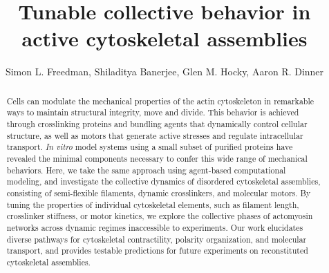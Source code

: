 \documentclass[12pt]{article}
\begin{document}
\title{Tunable collective behavior in active cytoskeletal assemblies}
\author{Simon L. Freedman, Shiladitya Banerjee, Glen M. Hocky, Aaron R. Dinner}
\date{}
\maketitle
\begin{abstract}
  Cells can modulate the mechanical properties of the actin cytoskeleton in 
  remarkable ways to maintain structural  integrity, move and divide. This 
  behavior is achieved through crosslinking proteins and bundling agents that 
  dynamically control cellular structure, as well as motors that generate
  active stresses and regulate intracellular transport. {\em In vitro} model 
  systems using a small subset of purified proteins have  revealed the minimal 
  components necessary to confer this wide range of mechanical behaviors. Here, 
  we take the same  approach using agent-based  computational modeling, and 
  investigate the collective dynamics of disordered   cytoskeletal assemblies, 
  consisting of  semi-flexible filaments, dynamic crosslinkers, and molecular 
  motors. By tuning  the properties of individual  cytoskeletal elements, such 
  as filament length, crosslinker stiffness, or motor kinetics, we explore the
  collective  phases of actomyosin networks across dynamic regimes inaccessible 
  to experiments. Our work elucidates diverse pathways for cytoskeletal 
  contractility, polarity organization, and molecular transport, and provides 
  testable predictions for future experiments on reconstituted cytoskeletal 
  assemblies.  
\end{abstract}
\end{document}
